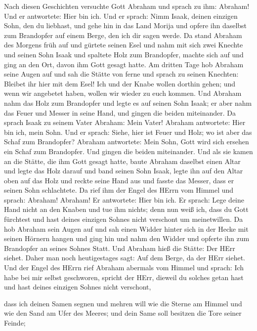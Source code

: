  Nach diesen Geschichten versuchte Gott Abraham und sprach
zu ihm: Abraham! Und er antwortete: Hier bin ich.  Und er
sprach: Nimm Isaak, deinen einzigen Sohn, den du liebhast, und gehe hin
in das Land Morija und opfere ihn daselbst zum Brandopfer auf einem
Berge, den ich dir sagen werde.  Da stand Abraham des
Morgens früh auf und gürtete seinen Esel und nahm mit sich zwei Knechte
und seinen Sohn Isaak und spaltete Holz zum Brandopfer, machte sich auf
und ging an den Ort, davon ihm Gott gesagt hatte.  Am
dritten Tage hob Abraham seine Augen auf und sah die Stätte von ferne
 und sprach zu seinen Knechten: Bleibet ihr hier mit dem
Esel! Ich und der Knabe wollen dorthin gehen; und wenn wir angebetet
haben, wollen wir wieder zu euch kommen.  Und Abraham nahm
das Holz zum Brandopfer und legte es auf seinen Sohn Isaak; er aber nahm
das Feuer und Messer in seine Hand, und gingen die beiden miteinander.
 Da sprach Isaak zu seinem Vater Abraham: Mein Vater!
Abraham antwortete: Hier bin ich, mein Sohn. Und er sprach: Siehe, hier
ist Feuer und Holz; wo ist aber das Schaf zum Brandopfer? 
Abraham antwortete: Mein Sohn, Gott wird sich ersehen ein Schaf zum
Brandopfer. Und gingen die beiden miteinander.  Und als sie
kamen an die Stätte, die ihm Gott gesagt hatte, baute Abraham daselbst
einen Altar und legte das Holz darauf und band seinen Sohn Isaak, legte
ihn auf den Altar oben auf das Holz  und reckte seine Hand
aus und fasste das Messer, dass er seinen Sohn schlachtete.
 Da rief ihm der Engel des HErrn vom Himmel und sprach:
Abraham! Abraham! Er antwortete: Hier bin ich.  Er sprach:
Lege deine Hand nicht an den Knaben und tue ihm nichts; denn nun weiß
ich, dass du Gott fürchtest und hast deines einzigen Sohnes nicht
verschont um meinetwillen.  Da hob Abraham sein Augen auf
und sah einen Widder hinter sich in der Hecke mit seinen Hörnern hangen
und ging hin und nahm den Widder und opferte ihn zum Brandopfer an
seines Sohnes Statt.  Und Abraham hieß die Stätte: Der HErr
siehet. Daher man noch heutigestages sagt: Auf dem Berge, da der HErr
siehet.  Und der Engel des HErrn rief Abraham abermals vom
Himmel  und sprach: Ich habe bei mir selbst geschworen,
spricht der HErr, dieweil du solches getan hast und hast deines einzigen
Sohnes nicht verschont,

 dass ich deinen Samen segnen und mehren will wie die
Sterne am Himmel und wie den Sand am Ufer des Meeres; und dein Same soll
besitzen die Tore seiner Feinde;

